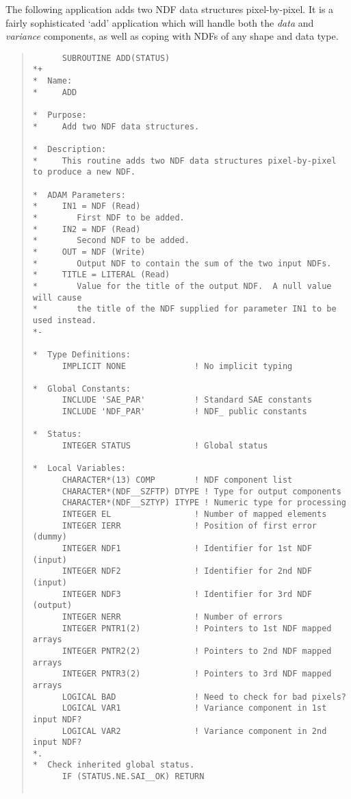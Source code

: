 The following application adds two NDF data structures pixel-by-pixel.
It is a fairly sophisticated `add' application which will handle both the {\em
data\/} and {\em variance\/} components, as well as coping with NDFs of any
shape and data type.

\begin{quote}

\begin{small}
\begin{verbatim}
      SUBROUTINE ADD(STATUS)
*+
*  Name:
*     ADD

*  Purpose:
*     Add two NDF data structures.

*  Description:
*     This routine adds two NDF data structures pixel-by-pixel to produce a new NDF.

*  ADAM Parameters:
*     IN1 = NDF (Read)
*        First NDF to be added.
*     IN2 = NDF (Read)
*        Second NDF to be added.
*     OUT = NDF (Write)
*        Output NDF to contain the sum of the two input NDFs.
*     TITLE = LITERAL (Read)
*        Value for the title of the output NDF.  A null value will cause
*        the title of the NDF supplied for parameter IN1 to be used instead.
*-

*  Type Definitions:
      IMPLICIT NONE              ! No implicit typing

*  Global Constants:
      INCLUDE 'SAE_PAR'          ! Standard SAE constants
      INCLUDE 'NDF_PAR'          ! NDF_ public constants

*  Status:
      INTEGER STATUS             ! Global status

*  Local Variables:
      CHARACTER*(13) COMP        ! NDF component list
      CHARACTER*(NDF__SZFTP) DTYPE ! Type for output components
      CHARACTER*(NDF__SZTYP) ITYPE ! Numeric type for processing
      INTEGER EL                 ! Number of mapped elements
      INTEGER IERR               ! Position of first error (dummy)
      INTEGER NDF1               ! Identifier for 1st NDF (input)
      INTEGER NDF2               ! Identifier for 2nd NDF (input)
      INTEGER NDF3               ! Identifier for 3rd NDF (output)
      INTEGER NERR               ! Number of errors
      INTEGER PNTR1(2)           ! Pointers to 1st NDF mapped arrays
      INTEGER PNTR2(2)           ! Pointers to 2nd NDF mapped arrays
      INTEGER PNTR3(2)           ! Pointers to 3rd NDF mapped arrays
      LOGICAL BAD                ! Need to check for bad pixels?
      LOGICAL VAR1               ! Variance component in 1st input NDF?
      LOGICAL VAR2               ! Variance component in 2nd input NDF?
*.
*  Check inherited global status.
      IF (STATUS.NE.SAI__OK) RETURN


\end{verbatim}
\end{small}
\end{quote}
